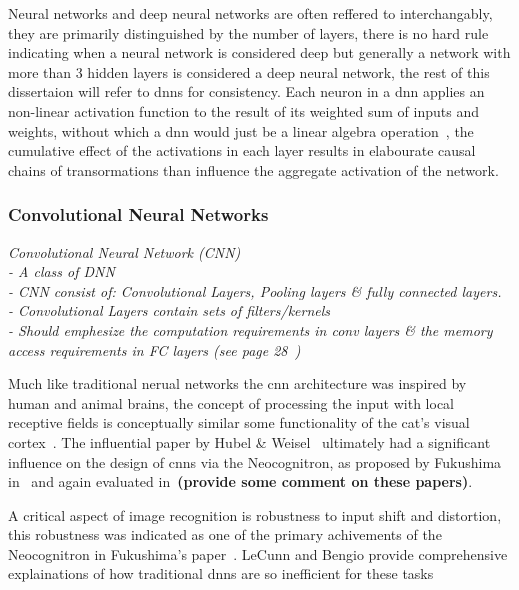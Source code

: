 \documentclass[../../D1.tex]{subfiles}
\begin{document}
Neural networks and deep neural networks are often reffered to interchangably, they are primarily distinguished by the number of layers, there is no hard rule indicating when a neural network is considered deep but generally a network with more than 3 hidden layers is considered a deep neural network, the rest of this dissertaion will refer to \acrshort{dnn}s for consistency. 
Each neuron in a \Acrshort{dnn} applies an non-linear activation function to the result of its weighted sum of inputs and weights, without which a \Acrshort{dnn} would just be a linear algebra operation~\autocite{szeEfficientProcessingDeep2017}, the cumulative effect of the activations in each layer results in elabourate causal chains of transormations than influence the aggregate activation of the network.



\subsubsection{Convolutional Neural Networks}

\emph{Convolutional Neural Network (CNN)\\
    - A class of DNN\\
    - CNN consist of: Convolutional Layers, Pooling layers \& fully connected layers.\\
    - Convolutional Layers contain sets of filters/kernels\\
    - Should emphesize the computation requirements in conv layers \& the memory access requirements in FC layers (see page 28~\autocite{qiuGoingDeeperEmbedded2016})}


Much like traditional nerual networks the \Acrshort{cnn} architecture was inspired by human and animal brains, the concept of processing the input with local receptive fields is conceptually similar some functionality of the cat's visual cortex~\autocite{hubelReceptiveFieldsBinocular1962,lecunConvolutionalNetworksImages,pouyanfarSurveyDeepLearning2019}. 
The influential paper by Hubel \& Weisel~\autocite{hubelReceptiveFieldsBinocular1962} ultimately had a significant influence on the design of \Acrshort{cnn}s via the Neocognitron, as proposed by Fukushima in~\autocite{fukushimaNeocognitronSelforganizingNeural1980} and again evaluated in~\autocite{fukushimaNeocognitronHierarchicalNeural1988}\textbf{(provide some comment on these papers)}. 

A critical aspect of image recognition is robustness to input shift and distortion, this robustness was indicated as one of the primary achivements of the Neocognitron in Fukushima's paper~\autocite{fukushimaNeocognitronSelforganizingNeural1980}. LeCunn and Bengio provide comprehensive explainations of how traditional \acrshort{dnn}s are so inefficient for these tasks 
\end{document}
